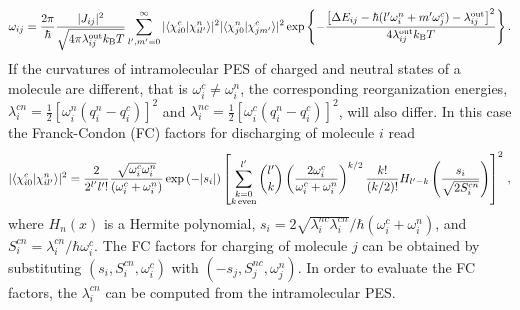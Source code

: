\begin{align}
 \omega_{ij}= \frac{2\pi}{\hbar}  \frac{|J_{ij}|^2}{\sqrt{4\pi \lambda_{ij}^\text{out} k_\text{B}T}}
 \sum_{l',m'=0}^\infty
 |\langle \chi_{i0}^c |\chi_{il'}^n \rangle|^2 |\langle \chi_{j0}^n |\chi_{jm'}^c \rangle|^2
\exp
\left\{ -\frac{ \left[ \Delta E_{ij}-\hbar(l'\omega_i^n+m'\omega_j^c) -\lambda_{ij}^\text{out} \right]^2}{4\lambda_{ij}^\text{out} k_\text{B}T}
\right\} .
\label{equ:jjortner}
\end{align}
If the curvatures of intramolecular PES of charged and neutral states of a molecule are different, that is $\omega_i^c\neq\omega_i^n$, the corresponding reorganization energies, $\lambda_i^{cn}=\frac{1}{2}[\omega_i^n(q_i^n-q_i^c)]^2$ and $\lambda_i^{nc}=\frac{1}{2}[\omega_i^c(q_i^n-q_i^c)]^2$, will also differ. In this case the Franck-Condon (FC) factors for discharging of molecule $i$ read \cite{chang_new_2005}
\begin{align}
|\langle \chi_{i0}^c |\chi_{il'}^n \rangle|^2 =
\frac{2}{2^{l'}l'!} \frac{\sqrt{\omega_i^c\omega_i^n}}{(\omega_i^c+\omega_i^n)} \exp\left( -|s_i| \right)
 \left[ \sum_{\substack{k=0\\k\,\text{even}}}^{l'} {l' \choose k}
\left( \frac{2 \omega_i^c }{\omega_i^c+\omega_i^n}\right)^{k/2} \frac{k!}{(k/2)!}
H_{l'-k} \left( \frac{s_{i}}{\sqrt{2S^{cn}_i}}\right)
\right]^2
\, ,
\end{align}
where $H_n(x)$ is a Hermite polynomial, $s_i=2\sqrt{\lambda_i^{nc}\lambda_i^{cn}} / \hbar(\omega_i^c+\omega_i^n)$, and $S^{cn}_i=\lambda_i^{cn}/\hbar\omega_i^c$. The FC factors for charging of molecule $j$ can be obtained by substituting $(s_i,S^{cn}_i,\omega_i^c)$ with $(-s_j,S^{nc}_j, \omega_j^n)$. In order to evaluate the FC factors, the  $\lambda_i^{cn}$ can be computed from the intramolecular PES.

% 

